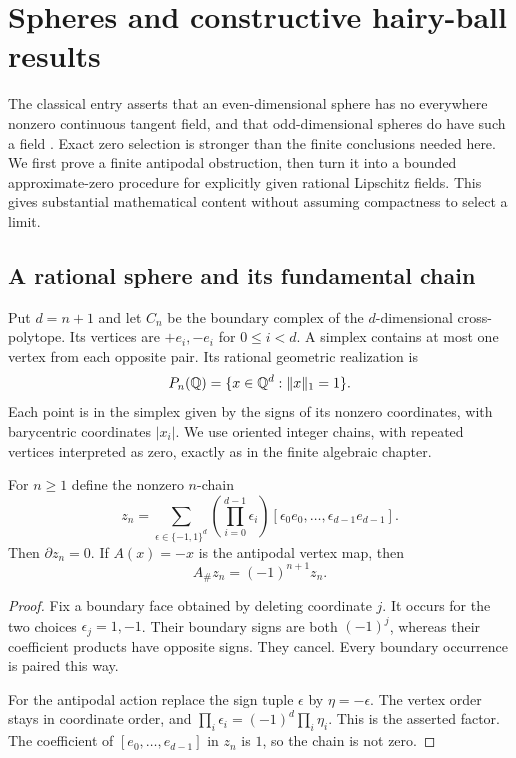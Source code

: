 \section{Spheres and constructive hairy-ball results}
\label{sec:spheres}

The classical entry asserts that an even-dimensional sphere has no everywhere nonzero continuous tangent field, and that odd-dimensional spheres do have such a field \cite{MWHairy}. Exact zero selection is stronger than the finite conclusions needed here. We first prove a finite antipodal obstruction, then turn it into a bounded approximate-zero procedure for explicitly given rational Lipschitz fields. This gives substantial mathematical content without assuming compactness to select a limit.

\subsection{A rational sphere and its fundamental chain}

Put $d=n+1$ and let $C_n$ be the boundary complex of the $d$-dimensional cross-polytope. Its vertices are $+e_i,-e_i$ for $0\leq i<d$. A simplex contains at most one vertex from each opposite pair. Its rational geometric realization is
\[
 P_n(\mathbb Q)=\{x\in\mathbb Q^d:\|x\|_1=1\}.
\]
Each point is in the simplex given by the signs of its nonzero coordinates, with barycentric coordinates $|x_i|$. We use oriented integer chains, with repeated vertices interpreted as zero, exactly as in the finite algebraic chapter.

\begin{lemma}\label{lem:sphere-cycle}
For $n\geq1$ define the nonzero $n$-chain
\[
 z_n=\sum_{\epsilon\in\{-1,1\}^{d}}
 \left(\prod_{i=0}^{d-1}\epsilon_i\right)
 [\epsilon_0e_0,\ldots,\epsilon_{d-1}e_{d-1}].
\]
Then $\partial z_n=0$. If $A(x)=-x$ is the antipodal vertex map, then
\[
 A_\#z_n=(-1)^{n+1}z_n.
\]
\end{lemma}
\begin{proof}
Fix a boundary face obtained by deleting coordinate $j$. It occurs for the two choices $\epsilon_j=1,-1$. Their boundary signs are both $(-1)^j$, whereas their coefficient products have opposite signs. They cancel. Every boundary occurrence is paired this way.

For the antipodal action replace the sign tuple $\epsilon$ by $\eta=-\epsilon$. The vertex order stays in coordinate order, and
$\prod_i\epsilon_i=(-1)^d\prod_i\eta_i$. This is the asserted factor. The coefficient of $[e_0,\ldots,e_{d-1}]$ in $z_n$ is $1$, so the chain is not zero.
\end{proof}

